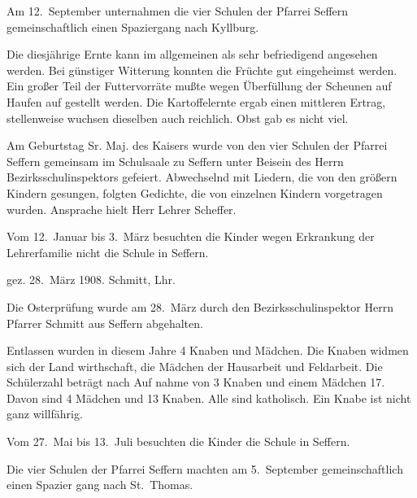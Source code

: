 

\pstart
Am 12.\ September unternahmen die vier Schulen\ob
der Pfarrei Seffern gemeinschaftlich einen\ob
Spaziergang nach Kyllburg.

\pend
{}
\pstart

Die diesjährige Ernte kann im allgemeinen als\ob
sehr befriedigend angesehen werden. Bei günstiger\ob
Witterung konnten die Früchte gut eingeheimst\ob
werden. Ein großer Teil der Futtervorräte mußte\ob
wegen Überfüllung der Scheunen auf Haufen auf\ohb
gestellt werden. Die Kartoffelernte ergab einen\ob
mittleren Ertrag, stellenweise wuchsen dieselben\ob
auch reichlich. Obst gab es nicht viel.

\pend
{}
\pstart

Am Geburtstag Sr. Maj. des Kaisers wurde von\ob
den vier Schulen der Pfarrei Seffern gemeinsam\ob
im Schulsaale zu Seffern unter Beisein des Herrn\ob
Bezirksschulinspektors gefeiert. Abwechselnd mit\ob
Liedern, die von den größern Kindern gesungen,\ob
folgten Gedichte, die von einzelnen Kindern\ob
vorgetragen wurden. Ansprache hielt Herr Lehrer\ob
Scheffer.

Vom 12.\ Januar bis 3.\ März besuchten die Kinder\ob
wegen Erkrankung der Lehrerfamilie nicht die\ob
Schule in Seffern.

gez. 28.\ März 1908.\ob
Schmitt, Lhr.

\pend
{}
\pstart

Die Osterprüfung wurde am 28.\ März durch den\ob
Bezirksschulinspektor Herrn Pfarrer Schmitt\ob
aus Seffern abgehalten.

\pend
{}
\pstart

Entlassen wurden in diesem Jahre 4 Knaben und Mädchen. Die Knaben widmen sich der Land\ohb
wirthschaft, die\unsicher{} Mädchen der Hausarbeit und\ob
Feldarbeit. Die Schülerzahl beträgt nach Auf\ohb
nahme von 3 Knaben und einem Mädchen 17.\ob
Davon sind 4 Mädchen und 13 Knaben. Alle sind\ob
katholisch. Ein Knabe ist nicht ganz willfährig.

Vom 27.\ Mai bis 13.\ Juli besuchten die Kinder\ob
die Schule in Seffern.

\pend
{}
\pstart

Die vier Schulen der Pfarrei Seffern machten\ob
am 5.\ September gemeinschaftlich einen Spazier\ohb
gang nach St.\ Thomas.
\pend
